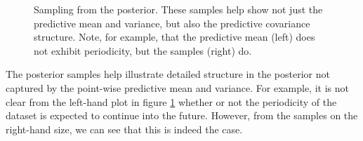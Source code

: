 \documentclass{article} %
\begin{document}


%
\begin{figure}[ht]
\centering
{}
\caption{Sampling from the posterior.  These samples help show not just the predictive mean and variance, but also the predictive covariance structure.  Note, for example, that the predictive mean (left) does not exhibit periodicity, but the samples (right) do.}
\label{fig:extrap-full}
\end{figure}
%
The posterior samples help illustrate detailed structure in the posterior not captured by the point-wise predictive mean and variance.  For example, it is not clear from the left-hand plot in figure \ref{fig:extrap-full} whether or not the periodicity of the dataset is expected to continue into the future.  However, from the samples on the right-hand size, we can see that this is indeed the case.  


\end{document}
